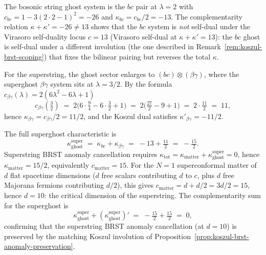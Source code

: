 \begin{computation}
\label{comp:superstring-ghost-koszul}
The bosonic string ghost system is the $bc$ pair at $\lambda = 2$
with $c_{bc} = 1 - 3(2{\cdot}2 - 1)^2 = -26$ and
$\kappa_{bc} = c_{bc}/2 = -13$. The complementarity relation
$\kappa + \kappa' = -26 \neq 13$ shows that the $bc$ system is
\emph{not} self-dual under the Virasoro self-duality locus
$c = 13$ \textup{(}Virasoro self-dual at
$\kappa + \kappa' = 13$\textup{)}: the $bc$ ghost is self-dual
under a different involution \textup{(}the one described in
Remark~\textup{\ref{rem:koszul-brst-scoping})} that fixes
the bilinear pairing but reverses the total $\kappa$.

For the superstring, the ghost sector enlarges to
$(bc) \otimes (\beta\gamma)$, where the superghost
$\beta\gamma$ system sits at $\lambda = 3/2$. By the
formula $c_{\beta\gamma}(\lambda) = 2(6\lambda^2 - 6\lambda + 1)$ \[
 c_{\beta\gamma}(\tfrac{3}{2})
 \;=\; 2\bigl(6 \cdot \tfrac{9}{4}
 - 6 \cdot \tfrac{3}{2} + 1\bigr)
 \;=\; 2\bigl(\tfrac{27}{2} - 9 + 1\bigr)
 \;=\; 2 \cdot \tfrac{11}{2}
 \;=\; 11,
\]
hence $\kappa_{\beta\gamma} = c_{\beta\gamma}/2 = 11/2$, and the
Koszul dual satisfies $\kappa'_{\beta\gamma} = -11/2$.

The full superghost characteristic is
\[
 \kappa_{\mathrm{ghost}}^{\mathrm{super}}
 \;=\; \kappa_{bc} + \kappa_{\beta\gamma}
 \;=\; -13 + \tfrac{11}{2}
 \;=\; -\tfrac{15}{2}.
\]
Superstring BRST anomaly cancellation requires
$\kappa_{\mathrm{tot}} = \kappa_{\mathrm{matter}}
+ \kappa_{\mathrm{ghost}}^{\mathrm{super}} = 0$,
hence $\kappa_{\mathrm{matter}} = 15/2$, equivalently
$c_{\mathrm{matter}} = 15$. For the $N = 1$ superconformal
matter of $d$ flat spacetime dimensions
($d$ free scalars contributing $d$ to $c$, plus $d$ free
Majorana fermions contributing $d/2$), this gives
$c_{\mathrm{matter}} = d + d/2 = 3d/2 = 15$, hence
$d = 10$: the critical dimension of the superstring. The
complementarity sum for the superghost is
\[
 \kappa_{\mathrm{ghost}}^{\mathrm{super}}
 + (\kappa_{\mathrm{ghost}}^{\mathrm{super}})'
 \;=\; -\tfrac{15}{2} + \tfrac{15}{2}
 \;=\; 0,
\]
confirming that the superstring BRST anomaly cancellation
\textup{(}at $d = 10$\textup{)} is preserved by the matching
Koszul involution of Proposition~\ref{prop:koszul-brst-anomaly-preservation}.
\end{computation}

